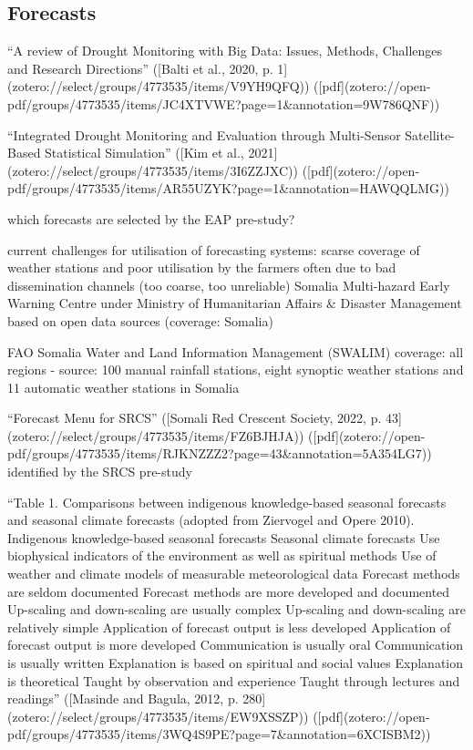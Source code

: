 {%

\subsection{Forecasts}

“A review of Drought Monitoring with Big Data: Issues, Methods, Challenges and Research Directions” ([Balti et al., 2020, p. 1](zotero://select/groups/4773535/items/V9YH9QFQ)) ([pdf](zotero://open-pdf/groups/4773535/items/JC4XTVWE?page=1&annotation=9W786QNF))

“Integrated Drought Monitoring and Evaluation through Multi-Sensor Satellite-Based Statistical Simulation” ([Kim et al., 2021](zotero://select/groups/4773535/items/3I6ZZJXC)) ([pdf](zotero://open-pdf/groups/4773535/items/AR55UZYK?page=1&annotation=HAWQQLMG))

which forecasts are selected by the EAP pre-study?

current challenges for utilisation of forecasting systems: scarse coverage of weather stations and poor utilisation by the farmers often due to bad dissemination channels  (too coarse, too unreliable)
Somalia Multi-hazard Early Warning Centre under Ministry of Humanitarian Affairs & Disaster Management
based on open data sources (coverage: Somalia)

FAO Somalia Water and Land Information Management (SWALIM) coverage: all regions - source: 100 manual rainfall stations, eight synoptic weather stations and 11 automatic weather stations in Somalia

“Forecast Menu for SRCS” ([Somali Red Crescent Society, 2022, p. 43](zotero://select/groups/4773535/items/FZ6BJHJA)) ([pdf](zotero://open-pdf/groups/4773535/items/RJKNZZZ2?page=43&annotation=5A354LG7))
identified by the SRCS pre-study

“Table 1. Comparisons between indigenous knowledge-based seasonal forecasts and seasonal climate forecasts (adopted from Ziervogel and Opere 2010). Indigenous knowledge-based seasonal forecasts Seasonal climate forecasts Use biophysical indicators of the environment as well as spiritual methods Use of weather and climate models of measurable meteorological data Forecast methods are seldom documented Forecast methods are more developed and documented Up-scaling and down-scaling are usually complex Up-scaling and down-scaling are relatively simple Application of forecast output is less developed Application of forecast output is more developed Communication is usually oral Communication is usually written Explanation is based on spiritual and social values Explanation is theoretical Taught by observation and experience Taught through lectures and readings” ([Masinde and Bagula, 2012, p. 280](zotero://select/groups/4773535/items/EW9XSSZP)) ([pdf](zotero://open-pdf/groups/4773535/items/3WQ4S9PE?page=7&annotation=6XCISBM2))

}
